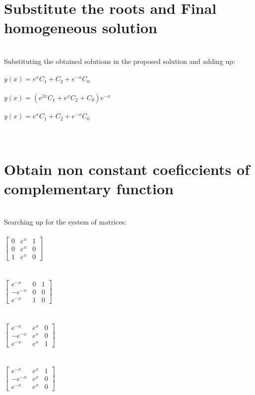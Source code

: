 \documentclass{article}
\begin{document}
\section{Substitute the roots and Final homogeneous solution}\\
Substituting the obtained solutions in the proposed solution and adding up: \\ \\$y(x) = e^{x} {C}_{1} + {C}_{2} + e^{- x} {C}_{0}$\\ \\$y(x) = \left(e^{2 x} {C}_{1} + e^{x} {C}_{2} + {C}_{0}\right) e^{- x}$\\ \\$y(x) = e^{x} {C}_{1} + {C}_{2} + e^{- x} {C}_{0}$\\ \\\\
\section{Obtain non constant coeficcients of complementary function}\\
Searching up for the system of matrices: \\ \\$\left[\begin{matrix}0 & e^{x} & 1\\0 & e^{x} & 0\\1 & e^{x} & 0\end{matrix}\right]$\\ \\ \\$\left[\begin{matrix}e^{- x} & 0 & 1\\- e^{- x} & 0 & 0\\e^{- x} & 1 & 0\end{matrix}\right]$\\ \\ \\$\left[\begin{matrix}e^{- x} & e^{x} & 0\\- e^{- x} & e^{x} & 0\\e^{- x} & e^{x} & 1\end{matrix}\right]$\\ \\ \\$\left[\begin{matrix}e^{- x} & e^{x} & 1\\- e^{- x} & e^{x} & 0\\e^{- x} & e^{x} & 0\end{matrix}\right]$\\ \\ \\\\
\end{document}
